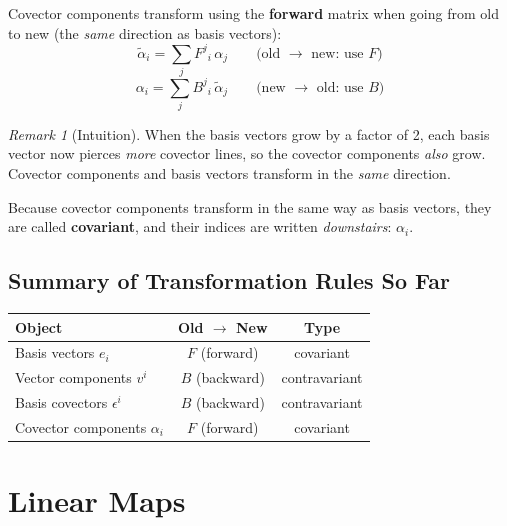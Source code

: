 \documentclass[12pt, a4paper]{report}
\theoremstyle{definition}
\theoremstyle{plain}
\theoremstyle{remark}
\newtheorem{remark}{Remark}[chapter]
\begin{document}
Covector components transform using the \textbf{forward} matrix when going from old
to new (the \emph{same} direction as basis vectors):
\begin{equation}\label{eq:cov-comp-fwd}
    \boxed{\tilde{\alpha}_i = \sum_{j} F^{j}{}_{i}\, \alpha_j}
    \qquad\text{(old $\to$ new: use $F$)}
\end{equation}
\begin{equation}\label{eq:cov-comp-bwd}
    \boxed{\alpha_i = \sum_{j} B^{j}{}_{i}\, \tilde{\alpha}_j}
    \qquad\text{(new $\to$ old: use $B$)}
\end{equation}

\begin{remark}[Intuition]
When the basis vectors grow by a factor of 2, each basis vector now pierces
\emph{more} covector lines, so the covector components \emph{also} grow.
Covector components and basis vectors transform in the \emph{same} direction.
\end{remark}

Because covector components transform in the same way as basis vectors, they are
called \textbf{covariant}, and their indices are written \emph{downstairs}:
$\alpha_{i}$.

\section{Summary of Transformation Rules So Far}

\begin{center}
\renewcommand{\arraystretch}{1.4}
\begin{tabular}{lcc}
    \toprule
    \textbf{Object} & \textbf{Old $\to$ New} & \textbf{Type} \\
    \midrule
    Basis vectors $e_i$            & $F$ (forward)  & covariant \\
    Vector components $v^{i}$      & $B$ (backward) & contravariant \\
    Basis covectors $\epsilon^{i}$ & $B$ (backward) & contravariant \\
    Covector components $\alpha_i$ & $F$ (forward)  & covariant \\
    \bottomrule
\end{tabular}
\end{center}

\chapter{Linear Maps}\label{ch:linear-maps}
\end{document}

